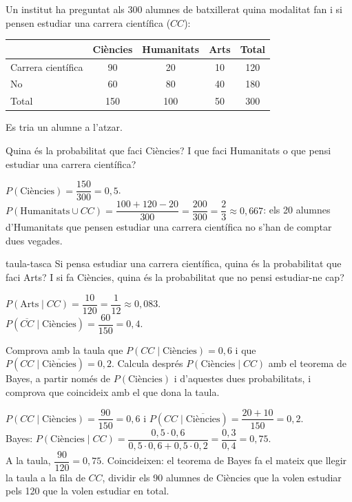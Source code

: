 Un institut ha preguntat als 300 alumnes de batxillerat quina modalitat fan i si pensen estudiar una
carrera científica ($CC$):
\begin{center}
\begin{tabular}{l|ccc|c}
 & Ciències & Humanitats & Arts & Total\\ \hline
Carrera científica & 90 & 20 & 10 & 120\\
No & 60 & 80 & 40 & 180\\ \hline
Total & 150 & 100 & 50 & 300
\end{tabular}
\end{center}
Es tria un alumne a l'atzar.

\begin{apartats}

Quina és la probabilitat que faci Ciències? I que faci Humanitats o que pensi estudiar una carrera
científica?

\begin{solucio}
$P(\text{Ciències})=\dfrac{150}{300}=0{,}5$.\\
$P(\text{Humanitats}\cup CC)=\dfrac{100+120-20}{300}=\dfrac{200}{300}=\dfrac23\approx0{,}667$: els 20
alumnes d'Humanitats que pensen estudiar una carrera científica no s'han de comptar dues vegades.
\end{solucio}

\begin{tria}{taula-tasca}
Si pensa estudiar una carrera científica, quina és la probabilitat que faci Arts? I si fa Ciències, quina
és la probabilitat que no pensi estudiar-ne cap?

\begin{solucio}
$P(\text{Arts}\mid CC)=\dfrac{10}{120}=\dfrac1{12}\approx0{,}083$.\\
$P\left(\overline{CC}\mid\text{Ciències}\right)=\dfrac{60}{150}=0{,}4$.
\end{solucio}

Comprova amb la taula que $P(CC\mid\text{Ciències})=0{,}6$ i que
$P\left(CC\mid\overline{\text{Ciències}}\right)=0{,}2$. Calcula després $P(\text{Ciències}\mid CC)$ amb el
teorema de Bayes, a partir només de $P(\text{Ciències})$ i d'aquestes dues probabilitats, i comprova que
coincideix amb el que dona la taula.

\begin{solucio}
$P(CC\mid\text{Ciències})=\dfrac{90}{150}=0{,}6$ i
$P\left(CC\mid\overline{\text{Ciències}}\right)=\dfrac{20+10}{150}=0{,}2$.\\
Bayes: $P(\text{Ciències}\mid CC)=\dfrac{0{,}5\cdot0{,}6}{0{,}5\cdot0{,}6+0{,}5\cdot0{,}2}
=\dfrac{0{,}3}{0{,}4}=0{,}75$.\\
A la taula, $\dfrac{90}{120}=0{,}75$. Coincideixen: el teorema de Bayes fa el mateix que llegir la taula a
la fila de $CC$, dividir els 90 alumnes de Ciències que la volen estudiar pels 120 que la volen estudiar
en total.
\end{solucio}
\end{tria}


\end{apartats}

